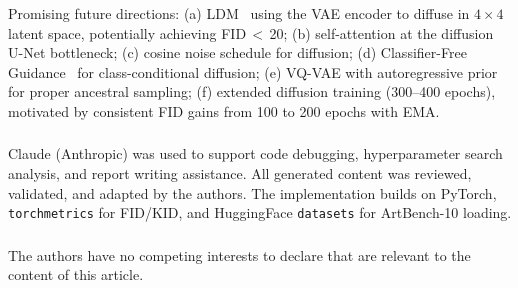 \documentclass[runningheads]{llncs}
\begin{document}
Promising future directions: (a) LDM~\cite{rombach2022} using the VAE encoder to diffuse in $4{\times}4$ latent space, potentially achieving FID\,$<$\,20; (b) self-attention at the diffusion U-Net bottleneck; (c) cosine noise schedule for diffusion; (d) Classifier-Free Guidance~\cite{ho2020} for class-conditional diffusion; (e) VQ-VAE with autoregressive prior~\cite{oord2017} for proper ancestral sampling; (f) extended diffusion training (300--400 epochs), motivated by consistent FID gains from 100 to 200 epochs with EMA.

\begin{credits}
\subsubsection{\ackname}
Claude (Anthropic) was used to support code debugging, hyperparameter search analysis, and report writing assistance. All generated content was reviewed, validated, and adapted by the authors. The implementation builds on PyTorch, \texttt{torchmetrics} for FID/KID, and HuggingFace \texttt{datasets} for ArtBench-10 loading.

\subsubsection{\discintname}
The authors have no competing interests to declare that are relevant to the content of this article.
\end{credits}
\end{document}
